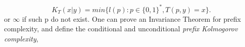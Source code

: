 \documentclass[12pt]{article}
\numberwithin{equation}{section}
\begin{document}
\begin{equation*}
	K_T(x|y)=min\{l(p):p \in \{0, 1\}^*, T(p,y)=x\}.
\end{equation*}
or $\infty$ if such p do not exist. One can prove an Invariance Theorem for prefix complexity, and define the conditional and unconditional \textit{prefix Kolmogorov complexity},
    
\normalsize
\clearpage
\renewcommand\refname{Reference}


\clearpage
\end{document}
